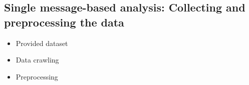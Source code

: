 \documentclass[
paper=128mm:96mm, %
fontsize=11pt, %
pagesize, %
parskip=half-, %
]{scrartcl} %
\newcommand{\red}[1]{\textit{\color{red}{#1}}}
\newcommand*{\mygreen}[1]{\textcolor{mygreen}{#1}}
\newcommand*{\myblue}[1]{\textcolor{myblue}{#1}}
\newcommand*{\mybrown}[1]{\textcolor{mybrown}{#1}}
\newcommand*{\myred}[1]{\textcolor{myred}{#1}}
\theoremstyle{mythmstyle} %
\begin{document}

\clearpage


\subsection*{Single message-based analysis: Collecting and preprocessing the data}

\begin{itemize}
\item Provided dataset
\item Data crawling
\item Preprocessing

\end{itemize}

\end{document}
